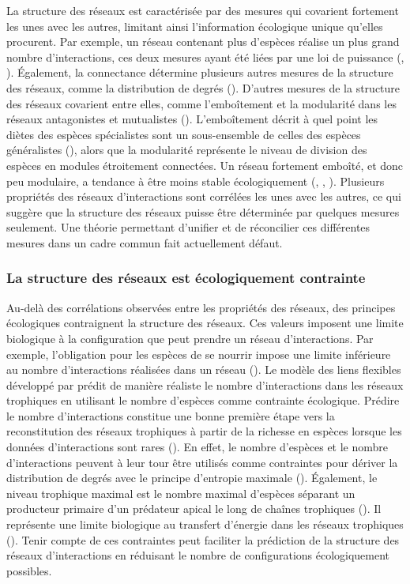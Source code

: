 La structure des réseaux est caractérisée par des mesures qui covarient
fortement les unes avec les autres, limitant ainsi l'information écologique
unique qu'elles procurent. Par exemple, un réseau contenant plus d'espèces
réalise un plus grand nombre d'interactions, ces deux mesures ayant été liées
par une loi de puissance (\cite{Brose2004Unified}, \cite{Riede2010Chapter}).
Également, la connectance détermine plusieurs autres mesures de la structure des
réseaux, comme la distribution de degrés (\cite{Poisot2014When}). D'autres
mesures de la structure des réseaux covarient entre elles, comme l'emboîtement
et la modularité dans les réseaux antagonistes et mutualistes
(\cite{Fortuna2010Nestedness}). L'emboîtement décrit à quel point les diètes des
espèces spécialistes sont un sous-ensemble de celles des espèces généralistes
(\cite{Staniczenko2013Ghost}), alors que la modularité représente le niveau de
division des espèces en modules étroitement connectées. Un réseau fortement
emboîté, et donc peu modulaire, a tendance à être moins stable écologiquement
(\cite{Okuyama2008Network}, \cite{Bastolla2009Architecture},
\cite{Thebault2010Stability}). Plusieurs propriétés des réseaux d'interactions
sont corrélées les unes avec les autres, ce qui suggère que la structure des
réseaux puisse être déterminée par quelques mesures seulement. Une théorie
permettant d'unifier et de réconcilier ces différentes mesures dans un cadre
commun fait actuellement défaut.

\subsubsection{La structure des réseaux est écologiquement contrainte} 

Au-delà des corrélations observées entre les propriétés des réseaux, des
principes écologiques contraignent la structure des réseaux. Ces valeurs
imposent une limite biologique à la configuration que peut prendre un réseau
d'interactions. Par exemple, l'obligation pour les espèces de se nourrir impose
une limite inférieure au nombre d'interactions réalisées dans un réseau
(\cite{MacDonald2020Revisiting}). Le modèle des liens flexibles développé par
\cite{MacDonald2020Revisiting} prédit de manière réaliste le nombre
d'interactions dans les réseaux trophiques en utilisant le nombre d'espèces
comme contrainte écologique. Prédire le nombre d'interactions constitue une
bonne première étape vers la reconstitution des réseaux trophiques à partir de
la richesse en espèces lorsque les données d'interactions sont rares
(\cite{Strydom2021Roadmapa}). En effet, le nombre d'espèces et le nombre
d'interactions peuvent à leur tour être utilisés comme contraintes pour dériver
la distribution de degrés avec le principe d'entropie maximale
(\cite{Williams2011Biology}). Également, le niveau trophique maximal est le
nombre maximal d'espèces séparant un producteur primaire d'un prédateur apical
le long de chaînes trophiques (\cite{Cohen1978Food}). Il représente une limite
biologique au transfert d'énergie dans les réseaux trophiques
(\cite{Williams2004Limits}). Tenir compte de ces contraintes peut faciliter la
prédiction de la structure des réseaux d'interactions en réduisant le nombre de
configurations écologiquement possibles.  

